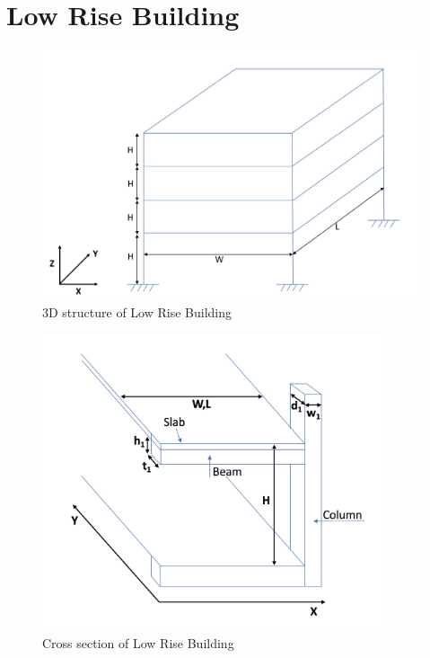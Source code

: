 \documentclass[11pt,a4paper,titlepage]{report}
\begin{document}
\section{Low Rise Building}
\begin{figure} [h]
    \centering
    \includegraphics[width=14cm]{3D_structure.jpeg}
    \caption{3D structure of Low Rise Building}
    \label{fig:3D LR}
\end{figure}
\begin{figure} [h]
    \centering
    \includegraphics[width=10cm]{low_rise_dimensions.jpeg}
    \caption{Cross section of Low Rise Building}
    \label{fig:I.1 - cross section of low rise building}
\end{figure}
\end{document}
